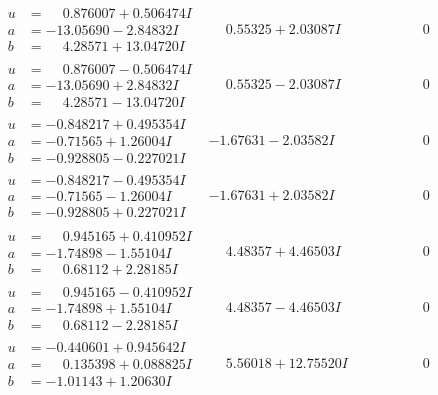 \documentclass[1p]{elsarticle_modified}
\theoremstyle{definition}
\begin{document}
$$\begin{array}{c|c|c}
\begin{aligned}
u &= \phantom{-}0.876007 + 0.506474 I \\
a &= -13.05690 - 2.84832 I \\
b &= \phantom{-}4.28571 + 13.04720 I\end{aligned}
 & \phantom{-}0.55325 + 2.03087 I & \phantom{-0.000000 } 0 \\ \hline\begin{aligned}
u &= \phantom{-}0.876007 - 0.506474 I \\
a &= -13.05690 + 2.84832 I \\
b &= \phantom{-}4.28571 - 13.04720 I\end{aligned}
 & \phantom{-}0.55325 - 2.03087 I & \phantom{-0.000000 } 0 \\ \hline\begin{aligned}
u &= -0.848217 + 0.495354 I \\
a &= -0.71565 + 1.26004 I \\
b &= -0.928805 - 0.227021 I\end{aligned}
 & -1.67631 - 2.03582 I & \phantom{-0.000000 } 0 \\ \hline\begin{aligned}
u &= -0.848217 - 0.495354 I \\
a &= -0.71565 - 1.26004 I \\
b &= -0.928805 + 0.227021 I\end{aligned}
 & -1.67631 + 2.03582 I & \phantom{-0.000000 } 0 \\ \hline\begin{aligned}
u &= \phantom{-}0.945165 + 0.410952 I \\
a &= -1.74898 - 1.55104 I \\
b &= \phantom{-}0.68112 + 2.28185 I\end{aligned}
 & \phantom{-}4.48357 + 4.46503 I & \phantom{-0.000000 } 0 \\ \hline\begin{aligned}
u &= \phantom{-}0.945165 - 0.410952 I \\
a &= -1.74898 + 1.55104 I \\
b &= \phantom{-}0.68112 - 2.28185 I\end{aligned}
 & \phantom{-}4.48357 - 4.46503 I & \phantom{-0.000000 } 0 \\ \hline\begin{aligned}
u &= -0.440601 + 0.945642 I \\
a &= \phantom{-}0.135398 + 0.088825 I \\
b &= -1.01143 + 1.20630 I\end{aligned}
 & \phantom{-}5.56018 + 12.75520 I & \phantom{-0.000000 } 0 \\ \hline\begin{aligned}

\end{aligned}
\end{array}$$
\end{document}
